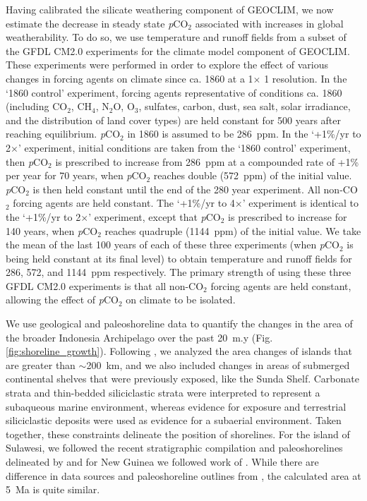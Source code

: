\documentclass[11pt,letterpaper]{article}
\newcommand{\degrees}{\textdegree\xspace}
\newcommand{\pCOtwo}{\textit{p}CO$_{2}$\xspace}
\newcommand{\COtwo}{CO$_{2}$\xspace}
\begin{document}
Having calibrated the  silicate weathering component of GEOCLIM, we now estimate the decrease in steady state \pCOtwo associated with increases in global weatherability. To do so, we use temperature and runoff fields from a subset of the GFDL CM2.0 experiments \citep{Delworth2006a, Delworth2006b} for the climate model component of GEOCLIM. These experiments were performed in order to explore the effect of various changes in forcing agents on climate since ca. 1860 at a 1\degrees $\times$ 1\degrees resolution. In the `1860 control' experiment, forcing agents representative of conditions ca. 1860 (including \COtwo, CH$_{4}$, N$_{2}$O, O$_{3}$, sulfates, carbon, dust, sea salt, solar irradiance, and the distribution of land cover types) are held constant for 500 years after reaching equilibrium. \pCOtwo in 1860 is assumed to be 286~ppm. In the `+1\%/yr to 2$\times$' experiment, initial conditions are taken from the `1860 control' experiment, then \pCOtwo is prescribed to increase from 286~ppm at a compounded rate of +1\% per year for 70 years, when \pCOtwo reaches double (572~ppm) of the initial value. \pCOtwo is then held constant until the end of the 280 year experiment. All non-\COtwo forcing agents are held constant. The `+1\%/yr to 4$\times$' experiment is identical to the `+1\%/yr to 2$\times$' experiment, except that \pCOtwo is prescribed to increase for 140 years, when \pCOtwo reaches quadruple (1144~ppm) of the initial value. We take the mean of the last 100 years of each of these three experiments (when \pCOtwo is being held constant at its final level) to obtain temperature and runoff fields for 286, 572, and 1144~ppm respectively. The primary strength of using these three GFDL CM2.0 experiments is that all non-\COtwo forcing agents are held constant, allowing the effect of \pCOtwo on climate to be isolated.

We use geological and paleoshoreline data to quantify the changes in the area of the broader Indonesia Archipelago over the past 20~m.y (Fig. \ref{fig:shoreline_growth}). Following \citet{Molnar2015a}, we analyzed the area changes of islands that are greater than $\sim$200~km, and we also included changes in areas of submerged continental shelves that were previously exposed, like the Sunda Shelf. Carbonate strata and thin-bedded siliciclastic strata were interpreted to represent a subaqueous marine environment, whereas evidence for exposure and terrestrial siliciclastic deposits were used as evidence for a subaerial environment. Taken together, these constraints delineate the position of shorelines. For the island of Sulawesi, we followed the recent stratigraphic compilation and paleoshorelines delineated by \citet{Nugraha2018a} and for New Guinea we followed work of \citet{Norvick2003a, Cloos2005a, Gold2017a}. While there are difference in data sources and paleoshoreline outlines from \cite{Molnar2015a}, the calculated area at 5~Ma is quite similar.
\end{document}
